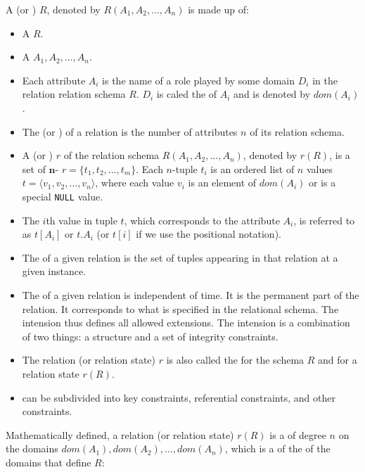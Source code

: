       \par A  (or ) $R$, denoted by $R(A_1, A_2, \ldots, A_n)$ is made up of:

      \begin{itemize}
        \item A  $R$.
        \item A  $A_1, A_2, \ldots, A_n$.
        \item Each attribute $A_i$ is the name of a role played by some domain $D_i$ in the relation relation schema $R$. $D_i$ is caled the  of $A_{i}$ and is denoted by $dom(A_i)$.
        \item The  (or ) of a relation is the number of attributes $n$ of its relation schema.
        \item A  (or ) $r$ of the relation schema $R(A_1, A_2, \ldots, A_n)$, denoted by $r(R)$, is a set of $\bm{n}$- $r = \{t_1, t_2, \ldots, t_m\}$. Each $n$-tuple $t_i$ is an ordered list of $n$ values $t = \langle v_1, v_2, \ldots, v_n \rangle$, where each value $v_i$ is an element of $dom(A_i)$ or is a special \lstinline{NULL} value.
        \item The $i$th value in tuple $t$, which corresponds to the attribute $A_i$, is referred to as $t[A_i]$ or $t.A_i$ (or $t[i]$ if we use the positional notation).
        \item The  of a given relation is the set of tuples appearing in that relation at a given instance.
        \item The  of a given relation is independent of time. It is the permanent part of the relation. It corresponds to what is specified in the relational schema. The intension thus defines all allowed extensions. The intension is a combination of two things: a structure and a set of integrity constraints.
        \item The relation (or relation state) $r$ is also called the  for the schema $R$ and  for a relation state $r(R)$.
        \item {} can be subdivided into key constraints, referential constraints, and other constraints.
      \end{itemize}
    \par Mathematically defined, a relation (or relation state) $r(R)$ is a  of degree $n$ on the domains $dom(A_1), dom(A_2), \ldots, dom(A_n)$, which is a  of the  of the domains that define $R$:
